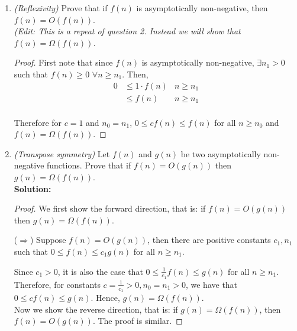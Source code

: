 \documentclass[letterpaper,11pt]{article}
\begin{document}
\begin{enumerate}
\begin{proof}
Then,
\begin{align*}
0 &\leq f(n)&n \geq n_1 \text{\quad(since $f(n) = O(g(n))$)} \\
  &\leq c_1g(n)&n \geq n_1 \text{\quad(since $f(n) = O(g(n))$)} \\
  &\leq c_1c_2h(n)& n \geq \max\{n_1,n_2\} \text{\quad(since $g(n) = O(h(n))$)}
\end{align*}
Therefore, for $c=c_1c_2$ and $n_0 = \max\{n_1,n_2\}$ we have that $0 \leq f(n) \leq ch(n)$ and $f(n) = O(h(n))$.
\end{proof}

\newpage
\item \emph{(Reflexivity)} Prove that if $f(n)$ is asymptotically non-negative, then $f(n) = O(f(n))$.\\
\emph{(Edit: This is a repeat of question 2. Instead we will show that $f(n) = \Omega(f(n))$.}

\begin{proof}
First note that since $f(n)$ is asymptotically non-negative, $\exists n_1 > 0$ such that $f(n) \geq 0$ $\forall n\geq n_1$. Then,
\begin{align*}
0 &\leq 1\cdot f(n)& n \geq n_1\\
  &\leq f(n) & n \geq n_1\\
\end{align*}

Therefore for $c=1$ and $n_0=n_1$, $0\leq cf(n) \leq f(n)$ for all $n\geq n_0$ and $f(n) = \Omega(f(n))$.
\end{proof}

\item \emph{(Transpose symmetry)} Let $f(n)$ and $g(n)$ be two asymptotically non-negative functions. Prove that if $f(n) = O(g(n))$ then $g(n) = \Omega(f(n))$.\\
\textbf{Solution:}
\begin{proof}
We first show the forward direction, that is: if $f(n) = O(g(n))$ then $g(n) = \Omega(f(n))$.

($\Rightarrow$) Suppose $f(n) = O(g(n))$, then there are positive constants $c_1,n_1$ such that $0\leq f(n) \leq c_1g(n)$ for all $n\geq n_1$.

Since $c_1>0$, it is also the case that $0\leq \frac{1}{c_1}f(n) \leq g(n)$ for all $n\geq n_1$. Therefore, for constants $c=\frac{1}{c_1}>0, n_0 = n_1>0$, we have that $0\leq cf(n) \leq g(n)$. Hence, $g(n) = \Omega(f(n))$.\\

Now we show the reverse direction, that is: if $g(n) = \Omega(f(n))$, then $f(n) = O(g(n))$. The proof is similar.


\end{proof}
\end{enumerate}
\end{document}
